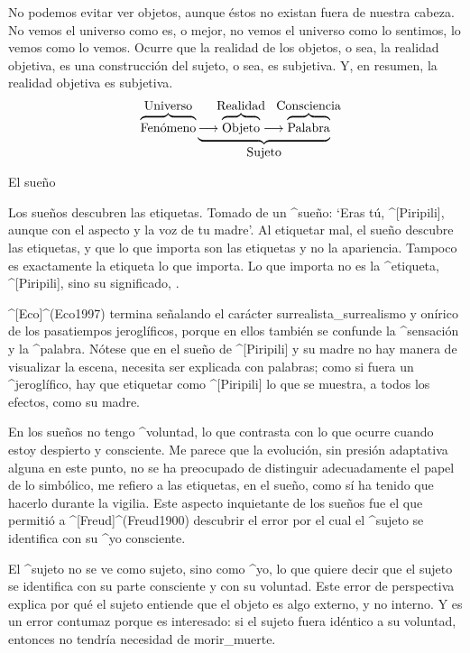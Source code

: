 No podemos evitar ver objetos, aunque éstos no existan fuera de nuestra
cabeza. No vemos el universo como es, o mejor, no vemos el universo como
lo sentimos, lo vemos como lo vemos. Ocurre que la realidad de los
objetos, o sea, la realidad objetiva, es una construcción del sujeto, o
sea, es subjetiva. Y, en resumen, la realidad objetiva es subjetiva.
\abovedisplayshortskip=12pt
$$\overbrace{\hbox{\strut Fenómeno}}^{\hbox{Universo}}
 \underbrace{\longrightarrow
  \overbrace{\hbox{\strut Objeto}}^{\hbox to0pt{\hss Realidad\hss}}
  \longrightarrow
  \overbrace{\hbox{\strut Palabra}}^{\hbox to 0pt{\hss
   Consciencia\hss}}}_{\hbox{Sujeto}}$$
\abovedisplayshortskip=0pt


\Section El sueño

Los sueños descubren las etiquetas. Tomado de un ^{sueño}: `Eras tú,
^[Piripili], aunque con el aspecto y la voz de tu madre'. Al etiquetar
mal, el sueño descubre las etiquetas, y que lo que importa son las
etiquetas y no la apariencia. Tampoco es exactamente la etiqueta lo que
importa. Lo que importa no es la ^{etiqueta}, ^[Piripili], sino su
significado, .

^[Eco]^(Eco1997) termina señalando el carácter surrealista_{surrealismo}
y onírico de los pasatiempos jeroglíficos, porque en ellos también se
confunde la ^{sensación} y la ^{palabra}. Nótese que en el sueño de
^[Piripili] y su madre no hay manera de visualizar la escena, necesita
ser explicada con palabras; como si fuera un ^{jeroglífico}, hay que
etiquetar como ^[Piripili] lo que se muestra, a todos los efectos, como
su madre.

En los sueños no tengo ^{voluntad}, lo que contrasta con lo que ocurre
cuando estoy despierto y consciente. Me parece que la evolución, sin
presión adaptativa alguna en este punto, no se ha preocupado de
distinguir adecuadamente el papel de lo simbólico, me refiero a las
etiquetas, en el sueño, como sí ha tenido que hacerlo durante la
vigilia. Este aspecto inquietante de los sueños fue el que permitió a
^[Freud]^(Freud1900) descubrir el error por el cual el ^{sujeto} se
identifica con su ^{yo} consciente.

El ^{sujeto} no se ve como sujeto, sino como ^{yo}, lo que quiere decir
que el sujeto se identifica con su parte consciente y con su voluntad.
Este error de perspectiva explica por qué el sujeto entiende que el
objeto es algo externo, y no interno. Y es un error contumaz porque es
interesado: si el sujeto fuera idéntico a su voluntad, entonces no
tendría necesidad de morir_{muerte}.



